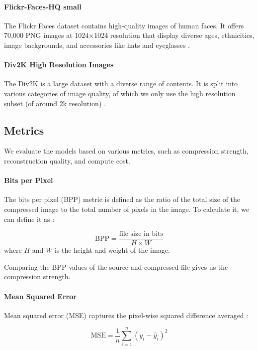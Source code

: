 \documentclass[conference]{IEEEtran}
\begin{document}
\paragraph{Flickr-Faces-HQ small}
The Flickr Faces dataset contains high-quality images of human faces. It offers 70,000 PNG images at 1024×1024 resolution that display diverse ages, ethnicities, image backgrounds, and accessories like hats and eyeglasses \cite{noauthor_flickr-faces-hq_nodate}.

\paragraph{Div2K High Resolution Images}
The Div2K is a large dataset with a diverse range of contents. It is split into various categories of image quality, of which we only use the high resolution subset (of around 2k resolution) \cite{noauthor_div2k_nodate}. 

\subsection{Metrics}
We evaluate the models based on various metrics, such as compression strength, reconstruction quality, and compute cost.

\paragraph{Bits per Pixel}
The bits per pixel (BPP) metric is defined as the ratio of the total size of the compressed image to the total number of pixels in the image. To calculate it, we can define it as \cite{ungureanu_image-compression_2024}:

\begin{equation}
    \text{BPP} = \frac{\text{file size in bits}}{H \times W}
\end{equation}
where $H$ and $W$ is the height and weight of the image.

Comparing the BPP values of the source and compressed file gives us the compression strength.

\paragraph{Mean Squared Error}
Mean squared error (MSE) captures the pixel-wise squared difference averaged \cite{ungureanu_image-compression_2024}: 

\begin{equation}
    \text{MSE} = \frac{1}{n} \sum_{i=1}^{n} (y_i - \hat{y}_i)^2
\end{equation}
\end{document}
